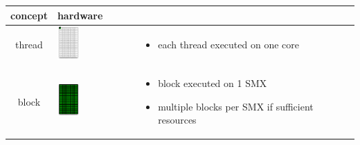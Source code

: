 \begin{frame}[fragile]{}
\begin{center}
\vspace{-0.75cm}
\begin{tabular}{|c|m{4cm}|m{5cm}|}
    \cline{1-2}
        concept & hardware &  \multicolumn{1}{c}{} \\
    \hline
        thread &
        \begin{minipage}{4cm}
            \includegraphics[width=0.3\textwidth]{./images/core.pdf}
        \end{minipage} &
        \footnotesize
        \begin{itemize}
            \item each thread executed on one core
        \end{itemize} \\
    \hline
        block &
        \begin{minipage}{4cm}
            \includegraphics[width=0.3\textwidth]{./images/smx.pdf}
        \end{minipage} &
        \footnotesize
        \begin{itemize}
            \item block executed on 1 SMX
            \item multiple blocks per SMX if sufficient resources

\end{itemize}
\end{tabular}
\end{center}
\end{frame}
